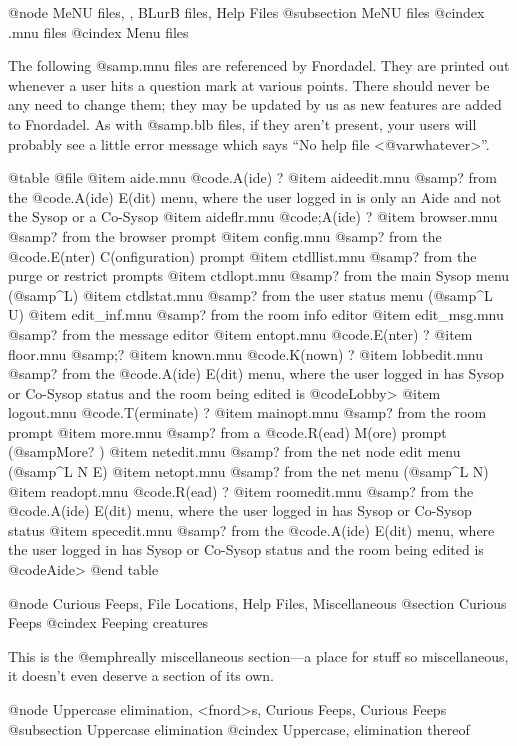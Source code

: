 {{{@node MeNU files,  , BLurB files, Help Files
@subsection MeNU files
@cindex .mnu files
@cindex Menu files

The following @samp{.mnu} files are referenced by Fnordadel.
They are printed out whenever a user hits a question mark at various
points.  There should never be any need to change them; they may be
updated by us as new features are added to Fnordadel.  As with
@samp{.blb} files, if they aren't present, your users will probably see
a little error message which says ``No help file <@var{whatever}>''.

@table @file
@item aide.mnu
@code{.A(ide) ?}
@item aideedit.mnu
@samp{?} from the @code{.A(ide) E(dit)} menu, where the
user logged in is only an Aide and not the Sysop or a Co-Sysop
@item aideflr.mnu
@code{;A(ide) ?}
@item browser.mnu
@samp{?} from the browser prompt
@item config.mnu
@samp{?} from the @code{.E(nter) C(onfiguration)} prompt
@item ctdllist.mnu
@samp{?} from the purge or restrict prompts
@item ctdlopt.mnu
@samp{?} from the main Sysop menu (@samp{^L})
@item ctdlstat.mnu
@samp{?} from the user status menu (@samp{^L U})
@item edit_inf.mnu
@samp{?} from the room info editor
@item edit_msg.mnu
@samp{?} from the message editor
@item entopt.mnu
@code{.E(nter) ?}
@item floor.mnu
@samp{;?}
@item known.mnu
@code{.K(nown) ?}
@item lobbedit.mnu
@samp{?} from the @code{.A(ide) E(dit)} menu, where
the user logged in has Sysop or Co-Sysop status and
the room being edited is @code{Lobby>}
@item logout.mnu
@code{.T(erminate) ?}
@item mainopt.mnu
@samp{?} from the room prompt
@item more.mnu
@samp{?} from a @code{.R(ead) M(ore)} prompt (@samp{More? })
@item netedit.mnu
@samp{?} from the net node edit menu (@samp{^L N E})
@item netopt.mnu
@samp{?} from the net menu (@samp{^L N})
@item readopt.mnu
@code{.R(ead) ?}
@item roomedit.mnu
@samp{?} from the @code{.A(ide) E(dit)} menu, where
the user logged in has Sysop or Co-Sysop status
@item specedit.mnu
@samp{?} from the @code{.A(ide) E(dit)} menu, where
the user logged in has Sysop or Co-Sysop status and
the room being edited is @code{Aide>}
@end table

@node Curious Feeps, File Locations, Help Files, Miscellaneous
@section Curious Feeps
@cindex Feeping creatures

This is the @emph{really} miscellaneous section---a place for stuff
so miscellaneous, it doesn't even deserve a section of its own.

@node Uppercase elimination, <fnord>s, Curious Feeps, Curious Feeps
@subsection Uppercase elimination
@cindex Uppercase, elimination thereof

}}}
